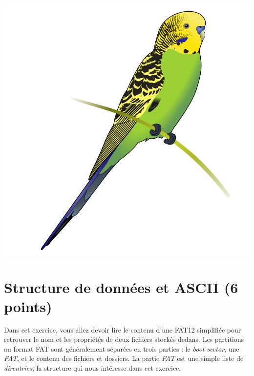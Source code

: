 \documentclass[11pt,a4paper]{article}
\begin{document}
\begin{center}
\includegraphics[scale=0.1]{img/others/Budgerigar_diagram.png}
\end{center}

\vspace*{-1cm}




\section{Structure de données et ASCII (6 points)}

\noindent Dans cet exercice, vous allez devoir lire le contenu d'une FAT12 simplifiée pour retrouver le nom et les propriétés de deux fichiers stockés dedans.
Les partitions au format FAT sont généralement séparées en trois parties : le \textit{boot sector}, une \textit{FAT}, et le contenu des fichiers et dossiers.
La partie \textit{FAT} est une simple liste de \textit{direntries}, la structure qui nous intéresse dans cet exercice.
\end{document}
